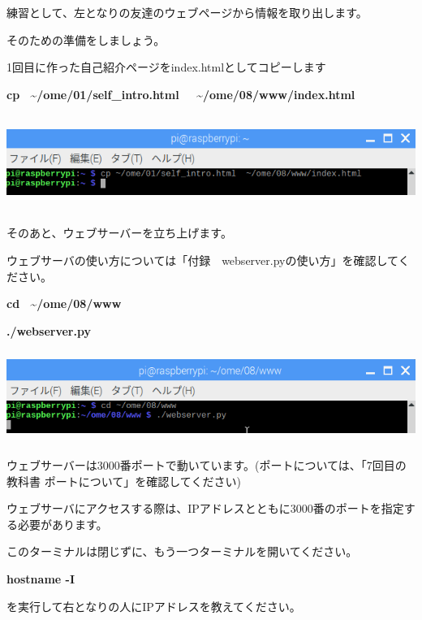 \documentclass[a4paper,12pt,dvipdfmx]{jarticle}
\begin{document}
練習として、左となりの友達のウェブページから情報を取り出します。

そのための準備をしましょう。

1回目に作った自己紹介ページをindex.htmlとしてコピーします

\textbf{cp \ \~{}/ome/01/self\_intro.html \ \ \~{}/ome/08/www/index.html}



\begin{center}
\includegraphics[width=17.006cm,height=3.134cm]{textbook-img002.png}

\end{center}
\clearpage
そのあと、ウェブサーバーを立ち上げます。

ウェブサーバの使い方については「付録　webserver.pyの使い方」を確認してください。

\textbf{cd \ \~{}/ome/08/www}

\textbf{./webserver.py}



\begin{center}
\includegraphics[width=17.006cm,height=2.992cm]{textbook-img003.png}

\end{center}
ウェブサーバーは3000番ポートで動いています。(ポートについては、「7回目の教科書
ポートについて」を確認してください)%


ウェブサーバにアクセスする際は、IPアドレスとともに3000番のポートを指定する必要があります。

このターミナルは閉じずに、もう一つターミナルを開いてください。

\textbf{hostname -I}

を実行して右となりの人にIPアドレスを教えてください。
\end{document}
